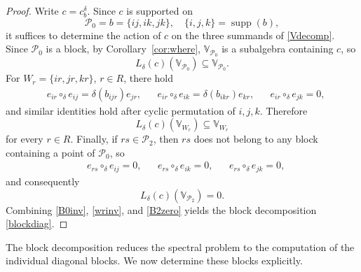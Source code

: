 \documentclass[times,11pt,reqno]{amsproc}
\theoremstyle{definition}
\numberwithin{equation}{section}
\def\valg{\mathbb{V}}
\DeclareMathOperator{\supp}{supp}
\begin{document}
\begin{proof}
Write $c=c_b^\delta.$ Since $c$ is supported on
$$
\mathcal{P}_0=b=\{ij,ik,jk\},\quad \{i,j,k\}=\supp(b),
$$
it suffices to determine the action of $c$ on the three summands of \eqref{Vdecomp}.
Since $\mathcal{P}_0$ is a block, by Corollary~\ref{cor:where}, $\valg_{\mathcal{P}_0}$ is a subalgebra containing $c$, so
\begin{equation}\label{B0inv}
L_\delta(c)(\valg_{\mathcal{P}_0})
\subseteq
\valg_{\mathcal{P}_0}.
\end{equation}
For $W_r=\{ir,jr,kr\}$, $r\in R$, there hold
\begin{align}\label{wr3}
&e_{ir}\circ_\delta e_{ij}=\delta(b_{ijr}) e_{jr},&
&e_{ir}\circ_\delta e_{ik}=\delta(b_{ikr}) e_{kr},&
&e_{ir}\circ_\delta e_{jk}=0,
\end{align}
and similar identities hold after cyclic permutation of $i,j,k$. Therefore
\begin{equation}\label{wrinv}
L_\delta(c)(\valg_{W_r})
\subseteq
\valg_{W_r}
\end{equation}
for every $r\in R$. Finally, if $rs\in\mathcal{P}_2$, then $rs$ does not belong to any block containing a point of $\mathcal{P}_0$, so
\begin{align}\label{B2a}
&e_{rs}\circ_\delta e_{ij}=0,
&&
e_{rs}\circ_\delta e_{ik}=0,
&&
e_{rs}\circ_\delta e_{jk}=0,
\end{align}
and consequently
\begin{equation}\label{B2zero}
L_\delta(c)(\valg_{\mathcal{P}_2})=0.
\end{equation}
Combining \eqref{B0inv}, \eqref{wrinv}, and \eqref{B2zero} yields the block decomposition \eqref{blockdiag}.
\end{proof}

The block decomposition reduces the spectral problem to the computation of the individual diagonal blocks. We now determine these blocks explicitly.
\end{document}
